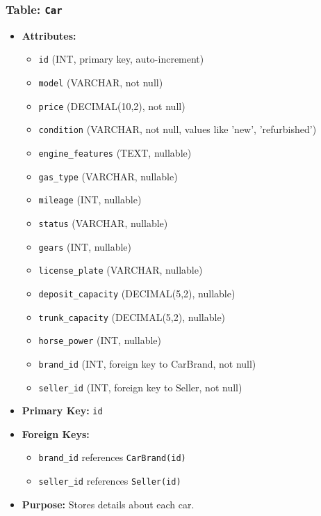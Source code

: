 \documentclass[11pt]{article}
\begin{document}
\subsubsection{Table: \texttt{Car}}
\label{sec:orge1f9115}
\begin{itemize}
\item \textbf{Attributes:}

\begin{itemize}
\item \texttt{id} (INT, primary key, auto-increment)
\item \texttt{model} (VARCHAR, not null)
\item \texttt{price} (DECIMAL(10,2), not null)
\item \texttt{condition} (VARCHAR, not null, values like 'new', 'refurbished')
\item \texttt{engine\_features} (TEXT, nullable)
\item \texttt{gas\_type} (VARCHAR, nullable)
\item \texttt{mileage} (INT, nullable)
\item \texttt{status} (VARCHAR, nullable)
\item \texttt{gears} (INT, nullable)
\item \texttt{license\_plate} (VARCHAR, nullable)
\item \texttt{deposit\_capacity} (DECIMAL(5,2), nullable)
\item \texttt{trunk\_capacity} (DECIMAL(5,2), nullable)
\item \texttt{horse\_power} (INT, nullable)
\item \texttt{brand\_id} (INT, foreign key to CarBrand, not null)
\item \texttt{seller\_id} (INT, foreign key to Seller, not null)
\end{itemize}

\item \textbf{Primary Key:} \texttt{id}
\item \textbf{Foreign Keys:}

\begin{itemize}
\item \texttt{brand\_id} references \texttt{CarBrand(id)}
\item \texttt{seller\_id} references \texttt{Seller(id)}
\end{itemize}

\item \textbf{Purpose:} Stores details about each car.
\end{itemize}
\end{document}

